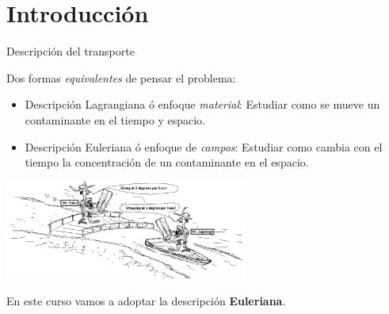 \subtitle{Ecuación de transporte}
\begin{frame}
  \titlepage
\end{frame}

\section{Introducción}


\begin{frame}{Descripción del transporte}


Dos formas \textit{equivalentes} de pensar el problema: 
\begin{itemize}
    \item Descripción \alert{Lagrangiana} ó enfoque \textit{material}: Estudiar como se mueve un contaminante en el tiempo y espacio.
    
    \item Descripción \alert{Euleriana} ó enfoque de \textit{campos}: Estudiar como cambia con el tiempo la concentración de un contaminante en el espacio.
    
\end{itemize}

\begin{center}
    \includegraphics[width=0.6\textwidth]{img/MaterialDerivative.png}
\end{center}

En este curso vamos a adoptar la descripción \textbf{Euleriana}.
    
\end{frame}


%
%    

